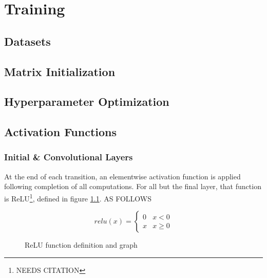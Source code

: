 \chapter{Training}

\section{Datasets}


\section{Matrix Initialization}

\section{Hyperparameter Optimization}

\newpage
\section{Activation Functions}
\label{sec:activation}
\subsection{Initial \& Convolutional Layers}
At the end of each transition, an elementwise activation function is applied 
following completion of all computations.  For all but the final layer, that 
function is ReLU\footnote{NEEDS CITATION}, defined in figure \ref{fig:relu}. AS 
FOLLOWS

\begin{figure}[h]
	\centering
	\begin{minipage}{.48\textwidth}
		\begin{equation*}
			relu(x) = \begin{cases}
				0 & x < 0\\
				x & x \geq 0
			\end{cases}
		\end{equation*}
	\end{minipage}
	\begin{minipage}{.48\textwidth}
	\end{minipage}
	\caption{ReLU function definition and graph}
	\label{fig:relu}
\end{figure}\noindent

